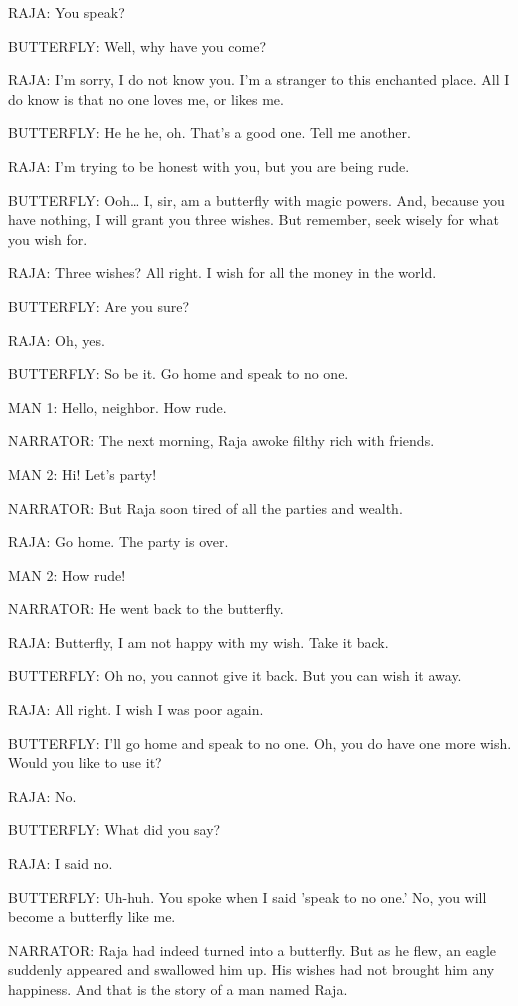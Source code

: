 RAJA:
You speak?

BUTTERFLY:
Well, why have you come?

RAJA:
I'm sorry, I do not know you.
I'm a stranger to this enchanted place.
All I do know is that no one loves me, or likes me.

BUTTERFLY:
He he he, oh.
That's a good one.
Tell me another.

RAJA:
I'm trying to be honest with you, but you are being rude.

BUTTERFLY:
Ooh\dots
I, sir, am a butterfly with magic powers.
And, because you have nothing, I will grant you three wishes.
But remember, seek wisely for what you wish for.

RAJA:
Three wishes?
All right.
I wish for all the money in the world.

BUTTERFLY:
Are you sure?

RAJA:
Oh, yes.

BUTTERFLY:
So be it.
Go home and speak to no one.

MAN 1:
Hello, neighbor.
How rude.

NARRATOR:
The next morning, Raja awoke filthy rich with friends.

MAN 2:
Hi!
Let's party!

NARRATOR:
But Raja soon tired of all the parties and wealth.

RAJA:
Go home.
The party is over.

MAN 2:
How rude!

NARRATOR:
He went back to the butterfly.

RAJA:
Butterfly, I am not happy with my wish.
Take it back.

BUTTERFLY:
Oh no, you cannot give it back.
But you can wish it away.

RAJA:
All right.
I wish I was poor again.

BUTTERFLY:
I'll go home and speak to no one.
Oh, you do have one more wish.
Would you like to use it?

RAJA:
No.

BUTTERFLY:
What did you say?

RAJA:
I said no.

BUTTERFLY:
Uh-huh.
You spoke when I said 'speak to no one.'
No, you will become a butterfly like me.

NARRATOR:
Raja had indeed turned into a butterfly.
But as he flew, an eagle suddenly appeared and swallowed him up.
His wishes had not brought him any happiness.
And that is the story of a man named Raja.

